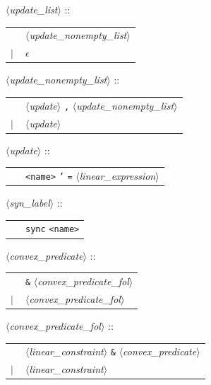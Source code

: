 \documentclass[a4paper,11pt]{report}
\newcommand{\emptystring}{$\epsilon$}
\newcommand{\nt}[1]{$\langle$\emph{#1}$\rangle$}
\newcommand{\regleGrammaire}[1]{\bigskip \noindent \nt{#1} :: \\}
\newcommand{\styleIMI}[1]{\textcolor{imicolor}{\texttt{#1}}}
\begin{document}
\regleGrammaire{update\_list}
\begin{tabular}{l l}
	\  & \nt{update\_nonempty\_list} \\
	$|$ & \emptystring \\
\end{tabular}

\regleGrammaire{update\_nonempty\_list}
\begin{tabular}{l l}
	\  & \nt{update} \styleIMI{,} \nt{update\_nonempty\_list} \\
	$|$ & \nt{update} \\
\end{tabular}

\regleGrammaire{update}
\begin{tabular}{l l}
	\  & \styleIMI{<name>} \styleIMI{'} \styleIMI{=} \nt{linear\_expression} \\
\end{tabular}

\regleGrammaire{syn\_label}
\begin{tabular}{l l}
	\  & \styleIMI{sync} \styleIMI{<name>} \\
\end{tabular}



\regleGrammaire{convex\_predicate}
\begin{tabular}{l l}
	\  & \styleIMI{\&} \nt{convex\_predicate\_fol} \\
	$|$ & \nt{convex\_predicate\_fol} \\
\end{tabular}

\regleGrammaire{convex\_predicate\_fol}
\begin{tabular}{l l}
	\  & \nt{linear\_constraint} \styleIMI{\&} \nt{convex\_predicate} \\
	$|$ & \nt{linear\_constraint} \\
\end{tabular}
\end{document}
